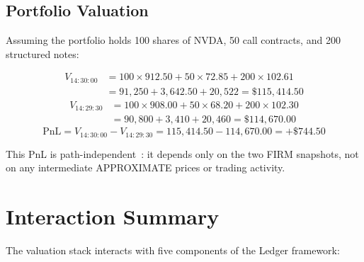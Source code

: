 \documentclass[11pt,a4paper]{article}
\begin{document}
\subsection{Portfolio Valuation}

Assuming the portfolio holds 100 shares of NVDA, 50 call contracts, and 200 structured notes:

\begin{align*}
V_{14:30:00} &= 100 \times 912.50 + 50 \times 72.85 + 200 \times 102.61 \\
&= 91{,}250 + 3{,}642.50 + 20{,}522 = \$115{,}414.50
\end{align*}
\begin{align*}
V_{14:29:30} &= 100 \times 908.00 + 50 \times 68.20 + 200 \times 102.30 \\
&= 90{,}800 + 3{,}410 + 20{,}460 = \$114{,}670.00
\end{align*}
\[
\mathrm{PnL} = V_{14:30:00} - V_{14:29:30} = 115{,}414.50 - 114{,}670.00 = +\$744.50
\]

This PnL is path-independent~\cite[\S4.3]{ledger}: it depends only on the two FIRM snapshots, not on any intermediate APPROXIMATE prices or trading activity.

\clearpage
\section{Interaction Summary}
\label{sec:interactions}

The valuation stack interacts with five components of the Ledger framework:
\end{document}
